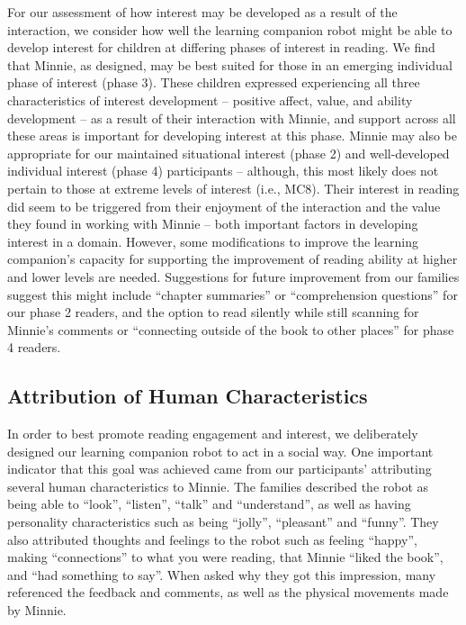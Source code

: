 \documentclass{sigchi}
\begin{document}
For our assessment of how interest may be developed as a result of the interaction, we consider how well the learning companion robot might be able to develop interest for children at differing phases of interest in reading. We find that Minnie, as designed, may be best suited for those in an emerging individual phase of interest (phase 3). These children expressed experiencing all three characteristics of interest development -- positive affect, value, and ability development -- as a result of their interaction with Minnie, and support across all these areas is important for developing interest at this phase. Minnie may also be appropriate for our maintained situational interest (phase 2) and well-developed individual interest (phase 4) participants --   although, this most likely does not pertain to those at extreme levels of interest (i.e., MC8). Their interest in reading did seem to be triggered from their enjoyment of the interaction and the value they found in working with Minnie -- both important factors in developing interest in a domain. However, some modifications to improve the learning companion's capacity for supporting the improvement of reading ability at higher and lower levels are needed. Suggestions for future improvement from our families suggest this might include ``chapter summaries'' or ``comprehension questions'' for our phase 2 readers, and the option to read silently while still scanning for Minnie's comments or ``connecting outside of the book to other places'' for phase 4 readers. 

\subsection{Attribution of Human Characteristics}

In order to best promote reading engagement and interest, we deliberately designed our learning companion robot to act in a social way. One important indicator that this goal was achieved came from our participants' attributing several human characteristics to Minnie. The families described the robot as being able to ``look'', ``listen'', ``talk'' and ``understand'', as well as having personality characteristics such as being ``jolly'', ``pleasant'' and ``funny''. They also attributed thoughts and feelings to the robot such as feeling ``happy'', making ``connections'' to what you were reading, that Minnie ``liked the book'', and ``had something to say''. When asked why they got this impression, many referenced the feedback and comments, as well as the physical movements made by Minnie. 
\end{document}
